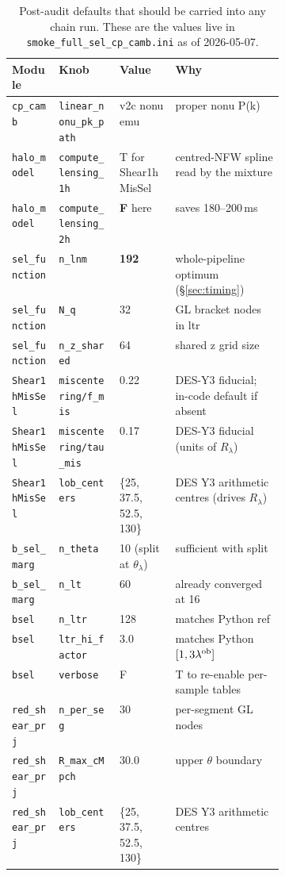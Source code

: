 \documentclass[a4paper, 11pt]{article}
\newcommand{\lob}{\lambda^{\rm ob}}
\newcommand{\modname}[1]{\textcolor{kwcol}{\texttt{#1}}}
\newcommand{\blk}[1]{\textcolor{datablockcol}{\texttt{#1}}}
\begin{document}
\begin{table}[H]
\centering
\small
\begin{tabular}{l l l p{0.40\linewidth}}
\toprule
Module & Knob & Value & Why \\
\midrule
\modname{cp\_camb}            & \texttt{linear\_nonu\_pk\_path} & v2c nonu emu & proper nonu P(k) \\
\modname{halo\_model}         & \texttt{compute\_lensing\_1h}   & T for Shear1hMisSel & centred-NFW spline read by the mixture \\
\modname{halo\_model}         & \texttt{compute\_lensing\_2h}   & \textbf{F} here          & saves 180--200\,ms \\
\modname{sel\_function}       & \texttt{n\_lnm}                 & \textbf{192}             & whole-pipeline optimum (\S\ref{sec:timing}) \\
\modname{sel\_function}       & \texttt{N\_q}                   & 32                      & GL bracket nodes in ltr \\
\modname{sel\_function}       & \texttt{n\_z\_shared}           & 64                      & shared z grid size \\
\modname{Shear1hMisSel}       & \blk{miscentering/f\_mis}       & 0.22                    & DES-Y3 fiducial; in-code default if absent \\
\modname{Shear1hMisSel}       & \blk{miscentering/tau\_mis}     & 0.17                    & DES-Y3 fiducial (units of $R_\lambda$) \\
\modname{Shear1hMisSel}       & \texttt{lob\_centers}           & \{25, 37.5, 52.5, 130\} & DES Y3 arithmetic centres (drives $R_\lambda$) \\
\modname{b\_sel\_marg}        & \texttt{n\_theta}               & 10 (split at $\theta_\lambda$) & sufficient with split \\
\modname{b\_sel\_marg}        & \texttt{n\_lt}                  & 60                      & already converged at 16 \\
\modname{bsel}                & \texttt{n\_ltr}                 & 128                     & matches Python ref \\
\modname{bsel}                & \texttt{ltr\_hi\_factor}        & 3.0                     & matches Python $[1, 3\lob]$ \\
\modname{bsel}                & \texttt{verbose}                & F                       & T to re-enable per-sample tables \\
\modname{red\_shear\_prj}     & \texttt{n\_per\_seg}            & 30                      & per-segment GL nodes \\
\modname{red\_shear\_prj}     & \texttt{R\_max\_cMpch}          & 30.0                    & upper $\theta$ boundary \\
\modname{red\_shear\_prj}     & \texttt{lob\_centers}           & \{25, 37.5, 52.5, 130\} & DES Y3 arithmetic centres \\
\bottomrule
\end{tabular}
\caption{Post-audit defaults that should be carried into any chain
run.  These are the values live in \modname{smoke\_full\_sel\_cp\_camb.ini}
as of 2026-05-07.}
\end{table}
\end{document}
